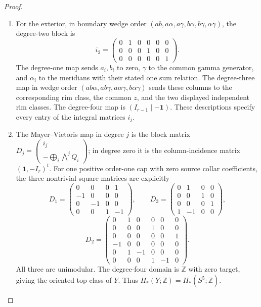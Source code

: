 \begin{proof}
\begin{enumerate}[label=\arabic*.]
\item For the exterior, in boundary wedge order
\((ab,a\alpha,a\gamma,b\alpha,b\gamma,\alpha\gamma)\), the
degree-two block is
\[
 i_2=\begin{pmatrix}
 0&1&0&0&0&0\\0&0&0&1&0&0\\0&0&0&0&0&1
 \end{pmatrix}.
\]
The degree-one map sends \(a_i,b_i\) to zero, \(\gamma\) to
the common gamma generator, and \(\alpha_i\) to the meridians with
their stated one sum relation.  The degree-three map in wedge order
\((ab\alpha,ab\gamma,a\alpha\gamma,b\alpha\gamma)\) sends
these columns to the corresponding rim class, the common \(z\),
and the two displayed independent rim classes.  The degree-four
map is \((I_{r-1}\mid-\mathbf1)\).  These descriptions specify
every entry of the integral matrices \(i_j\).

\item The Mayer--Vietoris map in degree \(j\) is the block matrix
\(D_j=\begin{pmatrix}i_j\\-\bigoplus_i\bigwedge^jQ_i\end{pmatrix}\); in degree zero it
is the column-incidence matrix \((\mathbf1,-I_r)^t\).
For one positive order-one cap with zero source collar coefficients,
the three nontrivial square matrices are explicitly
\[
 D_1=\begin{pmatrix}
 0&0&0&1\\-1&0&0&0\\0&-1&0&0\\0&0&1&-1
 \end{pmatrix},\qquad
 D_3=\begin{pmatrix}
 0&1&0&0\\0&0&1&0\\0&0&0&1\\1&-1&0&0
 \end{pmatrix},
\]
\[
 D_2=\begin{pmatrix}
 0&1&0&0&0&0\\0&0&0&1&0&0\\0&0&0&0&0&1\\
 -1&0&0&0&0&0\\0&1&-1&0&0&0\\0&0&0&1&-1&0
 \end{pmatrix}.
\]
All three are unimodular.  The degree-four domain is \(\mathbb Z\)
with zero target, giving the oriented top class of \(Y\).  Thus
\(H_*(Y;\mathbb Z)=H_*(S^5;\mathbb Z)\).


\end{enumerate}
\end{proof}
